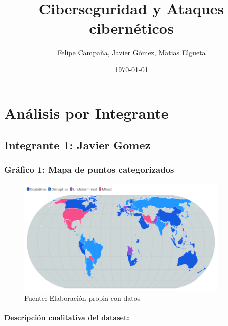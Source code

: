 \documentclass[12pt, a4paper]{article}
\title{Ciberseguridad y Ataques cibernéticos}
\author{Felipe Campaña, Javier Gómez, Matias Elgueta}
\date{\today\\[2cm]}
\begin{document}
\maketitle

\vspace*{0.3cm}
\begin{figure}[H]
    \centering
    \begin{minipage}[t]{0.45\linewidth}
    \end{minipage}
    \hfill
    \begin{minipage}[t]{0.45\linewidth}
    \end{minipage}
\end{figure}

\section*{Análisis por Integrante}

\subsection*{Integrante 1: Javier Gomez}


\subsubsection*{Gráfico 1: Mapa de puntos categorizados}
\begin{figure}[H]
    \centering
    \includegraphics[width=0.9\textwidth]{images/punto_cate.png}
    \caption{Fuente: Elaboración propia con datos}
\end{figure}

\paragraph{Descripción cualitativa del dataset:}
\end{document}

